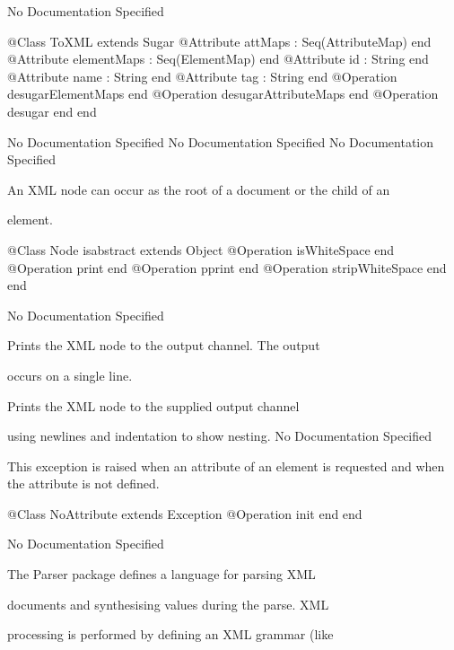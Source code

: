 No Documentation Specified
\begin{Interface}
@Class ToXML extends Sugar
  @Attribute attMaps : Seq(AttributeMap) end
  @Attribute elementMaps : Seq(ElementMap) end
  @Attribute id : String end
  @Attribute name : String end
  @Attribute tag : String end
  @Operation desugarElementMaps end
  @Operation desugarAttributeMaps end
  @Operation desugar end
end
\end{Interface}
No Documentation Specified
No Documentation Specified
No Documentation Specified

      An XML node can occur as the root of a document or the child of an

      element.
\begin{Interface}
@Class Node isabstract extends Object
  @Operation isWhiteSpace end
  @Operation print end
  @Operation pprint end
  @Operation stripWhiteSpace end
end
\end{Interface}
No Documentation Specified

        Prints the XML node to the output channel. The output

        occurs on a single line.

        Prints the XML node to the supplied output channel

        using newlines and indentation to show nesting.
No Documentation Specified

      This exception is raised when an attribute of an element is requested and 
      when the attribute is not defined.
\begin{Interface}
@Class NoAttribute extends Exception
  @Operation init end
end
\end{Interface}
No Documentation Specified

      The Parser package defines a language for parsing XML

      documents and synthesising values during the parse. XML

      processing is performed by defining an XML grammar (like

